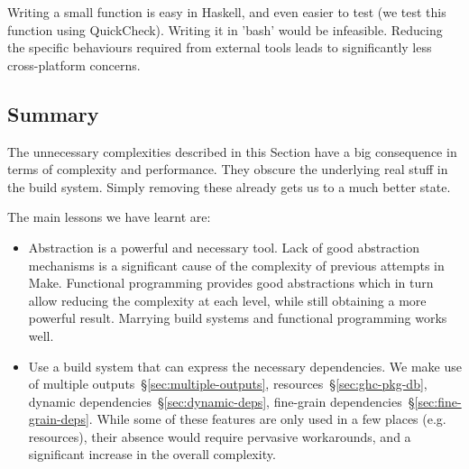 \noindent Writing a small function is easy in Haskell, and even easier to test
(we test this function using QuickCheck). Writing it in \lst'bash' would be infeasible.
Reducing the specific behaviours required from external tools leads to
significantly less cross-platform concerns.

\subsection{Summary}

The unnecessary complexities described in this Section have a big consequence in
terms of complexity and performance. They obscure the underlying real stuff in
the build system. Simply removing these already gets us to a much better state.

The main lessons we have learnt are:

\begin{itemize}
\item Abstraction is a powerful and necessary tool. Lack of good abstraction
mechanisms is a significant cause of the complexity of previous attempts in
Make. Functional programming provides good abstractions which in turn allow
reducing the complexity at each level, while still obtaining a more powerful
result. Marrying build systems and functional programming works well.
\item Use a build system that can express the necessary dependencies. We make
use of multiple outputs~\S\ref{sec:multiple-outputs},
resources~\S\ref{sec:ghc-pkg-db}, dynamic dependencies~\S\ref{sec:dynamic-deps},
fine-grain dependencies~\S\ref{sec:fine-grain-deps}. While some of these
features are only used in a few places (e.g. resources), their absence would
require pervasive workarounds, and a significant increase in the overall complexity.
\end{itemize}

%
%
%
%
